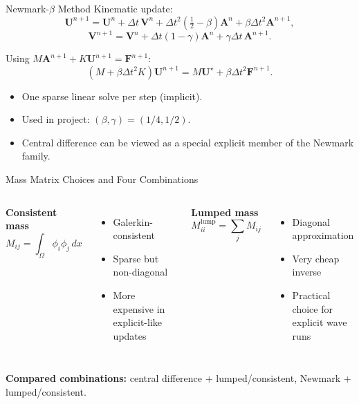 \documentclass{beamer}
\begin{document}
\begin{frame}{Newmark-\texorpdfstring{$\beta$}{beta} Method}
  Kinematic update:
  \[
    \mathbf U^{n+1}= \mathbf U^n+\Delta t\,\mathbf V^n
    +\Delta t^2\left(\tfrac12-\beta\right)\mathbf A^n
    +\beta\Delta t^2\mathbf A^{n+1},
  \]
  \[
    \mathbf V^{n+1}= \mathbf V^n+\Delta t(1-\gamma)\mathbf A^n
    +\gamma\Delta t\,\mathbf A^{n+1}.
  \]

  Using $M\mathbf A^{n+1}+K\mathbf U^{n+1}=\mathbf F^{n+1}$:
  \[
    \left(M+\beta\Delta t^2K\right)\mathbf U^{n+1}
    = M\mathbf U^\star+\beta\Delta t^2\mathbf F^{n+1}.
  \]

  \begin{itemize}
    \item One sparse linear solve per step (implicit).
    \item Used in project: $(\beta,\gamma)=(1/4,1/2)$.
    \item Central difference can be viewed as a special explicit member
          of the Newmark family.
  \end{itemize}
\end{frame}

\begin{frame}{Mass Matrix Choices and Four Combinations}
  \begin{columns}[t]
    \textbf{Consistent mass}
    \[
      M_{ij}=\int_\Omega\phi_i\phi_j\,dx
    \]
    \begin{itemize}
      \item Galerkin-consistent
      \item Sparse but non-diagonal
      \item More expensive in explicit-like updates
    \end{itemize}

    \textbf{Lumped mass}
    \[
      M^\text{lump}_{ii}=\sum_j M_{ij}
    \]
    \begin{itemize}
      \item Diagonal approximation
      \item Very cheap inverse
      \item Practical choice for explicit wave runs
    \end{itemize}
  \end{columns}

  \vspace{0.3em}
  \textbf{Compared combinations:}
  central difference + lumped/consistent, Newmark + lumped/consistent.
\end{frame}
\end{document}
